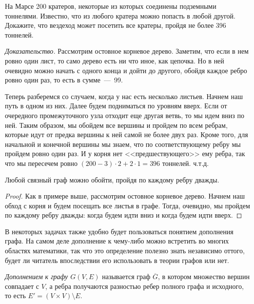 \begin{example}
	На Марсе 200 кратеров, некоторые из которых соединены подземными тоннелями. Известно, что из любого кратера можно попасть в любой другой. Докажите, что вездеход может посетить все кратеры, пройдя не более 396 тоннелей.
	
	\emph{Доказательство.} Рассмотрим остовное корневое дерево. Заметим, что если в нем ровно один лист, то само дерево есть ни что иное, как цепочка. Но в ней очевидно можно начать с одного конца и дойти до другого, обойдя каждое ребро ровно один раз, то есть в сумме~---~99.
	
	Теперь разберемся со случаем, когда у нас есть несколько листьев. Начнем наш путь в одном из них. Далее будем подниматься по уровням вверх. Если от очередного промежуточного узла отходит еще другая ветвь, то мы идем вниз по ней. Таким образом, мы обойдем все вершины и пройдем по всем ребрам, которые идут от предка вершины к ней самой не более двух раз. Кроме того, для начальной и конечной вершины мы знаем, что по соответствующему ребру мы пройдем ровно один раз. И у корня нет <<предшествующего>> ему ребра, так что мы пересечем ровно $(200 - 3) \cdot 2 + 2 \cdot 1 = 396$ тоннелей. ч.т.д.
\end{example}

\begin{statement}
	Любой связный граф можно обойти, пройдя по каждому ребру дважды.
	
\begin{proof}
	Как в примере выше, рассмотрим остовное корневое дерево. Начнем наш обход с корня и будем посещать все листья в графе. Тогда, очевидно, мы пройдем по каждому ребру дважды: когда будем идти вниз и когда будем идти вверх.
\end{proof}
\end{statement}


 В некоторых задачах также удобно будет пользоваться понятием дополнения графа. На самом деле дополнение к чему-либо можно встретить во многих областях математики, так что это определение полезно знать независимо оттого, будет ли читатель впоследствии его использовать в теории графов или нет.
	 
\begin{definition}
	\emph{Дополнением к графу $G\left(V, E\right)$} называется граф $\overline{G}$, в котором множество вершин совпадает с $V$, а ребра получаются разностью ребер полного графа и исходного, то есть $E' = (V \times V )\setminus E$.
\end{definition}


